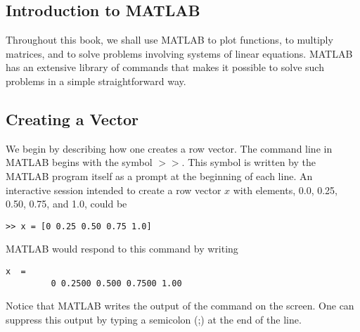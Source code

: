 \begin{backchapter}
\begin{frontmatter}
\chapter{Introduction to MATLAB}\label{app2}
\makechaptertitle
\end{frontmatter}

\def\thesection{\thechapter.\arabic{section}}

Throughout this book, we shall use MATLAB to plot functions, to
multiply matrices, and to solve problems involving systems of linear
equations. MATLAB has an extensive library of commands that makes it
possible to solve such problems in a simple straightforward
way.\vspace*{15pt}


\section{Creating a Vector}\label{app2:sec1}

We begin by describing how one creates a row vector. The command line in MATLAB begins with the symbol $>>$.  This symbol is  written by the MATLAB program itself as a prompt at the beginning of each line. An interactive session intended to create a row vector $x$ with elements, 0.0, 0.25, 0.50, 0.75, and 1.0, could be
\begin{verbatim}
>> x = [0 0.25 0.50 0.75 1.0]
\end{verbatim}


\noindent MATLAB would respond to this command by writing

\begin{verbatim}
x  =
         0 0.2500 0.500 0.7500 1.00
\end{verbatim}

\noindent Notice that MATLAB  writes the output of the command on the screen. One can suppress this output  by typing a semicolon (;) at the end of the line.

\end{backchapter}
